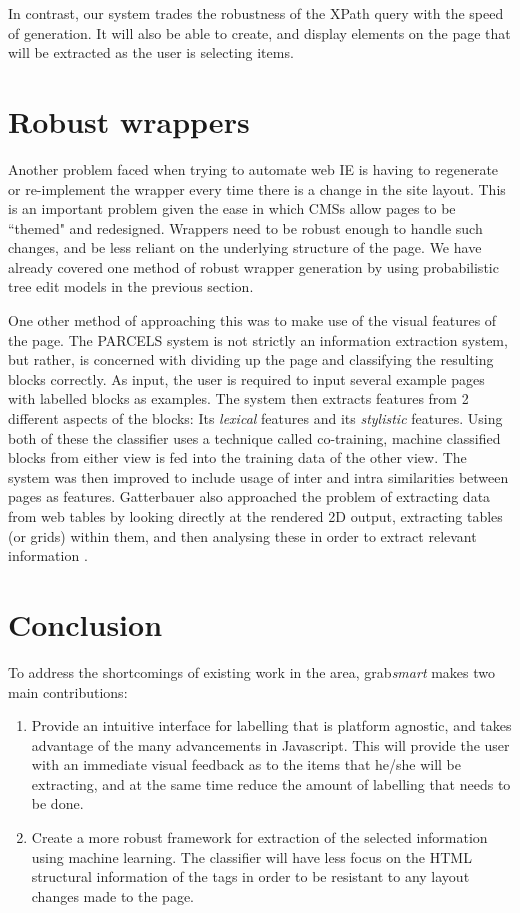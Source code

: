 In contrast, our system trades the robustness of the XPath
query with the speed of generation. It will also be able to create, and display
elements on the page that will be extracted as the user is selecting items.

\section{Robust wrappers}
Another problem faced when trying to automate web IE is having to regenerate or re-implement
the wrapper every time there is a change in the site layout. This is an important problem given
the ease in which CMSs allow pages to be ``themed" and redesigned. 
Wrappers need
to be robust enough to handle such changes, and be less reliant on the underlying
structure of the page. 
We have already covered one method of robust wrapper generation by using probabilistic tree edit models
in the previous section.

	
One other method of approaching this was to make use of the visual features of the page. The PARCELS \cite{Lee2004}
system is not strictly an information extraction system, but rather, is concerned with dividing
up the page and classifying the resulting blocks correctly. As input, the user is required to
input several example pages with labelled blocks as examples. The system then extracts features
from 2 different aspects of the blocks: Its \textit{lexical} features and its
\textit{stylistic} features. Using both of these the classifier uses a technique called
co-training, machine classified blocks from either view is fed into the training data of the
other view. The system was then improved to include usage of inter and intra
similarities between pages as features\cite{AikMiang2005}. Gatterbauer also approached the
problem of extracting data from web tables by looking directly at the rendered 2D output,
extracting tables (or grids) within them, and then analysing these in order to extract relevant
information \cite{Gatterbauer2007}.

\section{Conclusion}
To address the shortcomings of existing work in the area, grab\textit{smart}
makes two main contributions:
\begin{enumerate}
	\item Provide an intuitive interface for labelling that is platform agnostic, and takes advantage of the many advancements in Javascript. This will provide the user with an immediate visual feedback as to the items that he/she will be extracting, and at the same time reduce the amount of labelling that needs to be done.
	\item Create a more robust framework for extraction of the selected information using machine learning. The classifier will have less focus on the HTML structural information of the tags in order to be resistant to any layout changes made to the page.
\end{enumerate}

